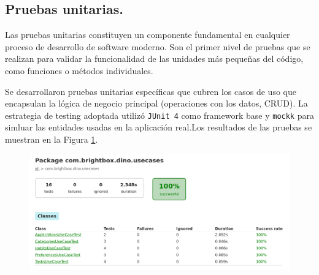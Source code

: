 \subsection{Pruebas unitarias.}

Las pruebas unitarias constituyen un componente fundamental en cualquier proceso de desarrollo de software moderno. Son el primer nivel de pruebas que se realizan para validar la funcionalidad de las unidades más pequeñas del código, como funciones o métodos individuales.

Se desarrollaron pruebas unitarias específicas que cubren los casos de uso que encapsulan la lógica de negocio principal (operaciones con los datos, CRUD). La estrategia de testing adoptada utilizó \texttt{JUnit 4} como framework base y \texttt{mockk} para simluar las entidades usadas en la aplicación real.Los resultados de las pruebas se muestran en la Figura \ref{fig:resultados_pruebas_unitarias}. 

\begin{figure}[ht!]
  \label{fig:resultados_pruebas_unitarias}
\includegraphics[width=\textwidth]{Figuras/resultados_pruebas_unitarias.png}
  \centering
\end{figure}